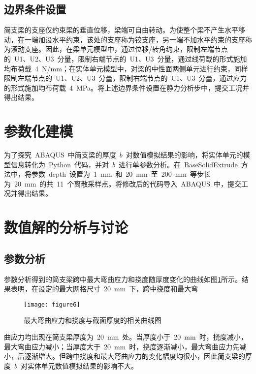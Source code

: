 \subsection{边界条件设置}
简支梁的支座仅约束梁的垂直位移，梁端可自由转动。为使整个梁不产生水平移动，在一端加设水平约束，该处的支座称为铰支座，另一端不加水平约束的支座称为滚动支座。因此，在梁单元模型中，通过位移/转角约束，限制左端节点的~U1、U2、U3~分量，限制右端节点的~U1、U3~分量\cite{gajdosova2018influence}，通过线荷载的形式施加均布荷载~4~N/mm；在实体单元模型中，对梁的中性面两侧单元进行约束\cite{JGXB201402012}，同样限制左端节点的~U1、U2、U3~分量，限制右端节点的~U1、U3~分量，通过应力的形式施加均布荷载~4~MPa。将上述边界条件设置在静力分析步中，提交工况并得出结果。
\section{参数化建模}
为了探究~ABAQUS~中简支梁的厚度~$b$~对数值模拟结果的影响，将实体单元的模型信息转化为~Python~代码，并对~$b$~进行单参数分析\cite{radon2015study,liu2016review}。在~BaseSolidExtrude~方法中，将参数~depth~设置为~1~mm~和~20~mm~至~200~mm~等步长为~20~mm~的共~11~个离散采样点\cite{fu2019recent}。将修改后的代码导入~ABAQUS~中，提交工况并得出结果。
\section{数值解的分析与讨论}
\subsection{参数分析}
参数分析得到的简支梁跨中最大弯曲应力和挠度随厚度变化的曲线如图\ref{fig:para}所示。结果表明，在设定的最大网格尺寸~20~mm~下，跨中挠度和最大弯\begin{figure}[htbp]
    \centering
	\texttt{[image: figure6]}
    \caption{最大弯曲应力和挠度与截面厚度的相关曲线图}
    \label{fig:para}
\end{figure}曲应力均出现在简支梁厚度为~20~mm~处。当厚度小于~20~mm~时，挠度减小，最大弯曲应力减小；当厚度大于~20~mm~时，挠度逐渐减小，最大弯曲应力先减小，后逐渐增大。但跨中挠度和最大弯曲应力的变化幅度均很小，因此简支梁的厚度~$b$~对实体单元数值模拟结果的影响不大。

